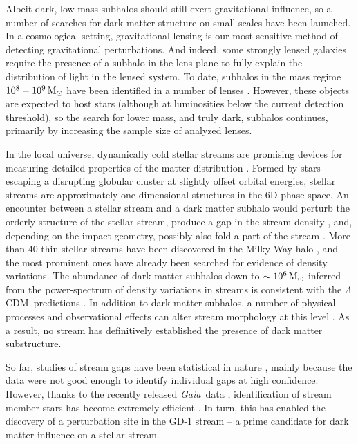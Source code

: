 \documentclass[twocolumn]{aastex62}
\newcommand{\acronym}[1]{{\small{#1}}}
\newcommand{\gaia}{\textsl{Gaia}}
\newcommand{\lcdm}{\acronym{$\Lambda$CDM}}
\begin{document}
Albeit dark, low-mass subhalos should still exert gravitational influence, so a number of searches for dark matter structure on small scales have been launched.
In a cosmological setting, gravitational lensing is our most sensitive method of detecting gravitational perturbations.
And indeed, some strongly lensed galaxies require the presence of a subhalo in the lens plane to fully explain the distribution of light in the lensed system.
To date, subhalos in the mass regime $10^8-10^9\,\rm M_\odot$ have been identified in a number of lenses \citep[e.g.,][]{vegetti2012,hezaveh2016}.
However, these objects are expected to host stars (although at luminosities below the current detection threshold), so the search for lower mass, and truly dark, subhalos continues, primarily by increasing the sample size of analyzed lenses.

In the local universe, dynamically cold stellar streams are promising devices for measuring detailed properties of the matter distribution \citep[e.g.,][]{johnston1999, bh2018}.
Formed by stars escaping a disrupting globular cluster at slightly offset orbital energies, stellar streams are approximately one-dimensional structures in the 6D phase space.
An encounter between a stellar stream and a dark matter subhalo would perturb the orderly structure of the stellar stream, produce a gap in the stream density \citep[e.g.,][]{carlberg2012}, and, depending on the impact geometry, possibly also fold a part of the stream \citep[e.g.,][]{yoon2011}.
More than 40 thin stellar streams have been discovered in the Milky Way halo \citep{gc2016}, and the most prominent ones have already been searched for evidence of density variations.
The abundance of dark matter subhalos down to $\sim10^6\,\rm M_\odot$ inferred from the power-spectrum of density variations in streams is consistent with the \lcdm\ predictions \citep[e.g.,][]{carlberg2012,cg2013}.
In addition to dark matter subhalos, a number of physical processes and observational effects can alter stream morphology at this level \citep[e.g.,][]{kupper2008, amorisco2016, ibata2016}.
As a result, no stream has definitively established the presence of dark matter substructure.

So far, studies of stream gaps have been statistical in nature \citep[e.g.,][]{erkal2017}, mainly because the data were not good enough to identify individual gaps at high confidence.
However, thanks to the recently released \gaia\ data \citep{gdr2}, identification of stream member stars has become extremely efficient \citep[e.g.,][]{malhan2018}.
In turn, this has enabled the discovery of a perturbation site in the GD-1 stream \citep{pwb} -- a prime candidate for dark matter influence on a stellar stream.
\end{document}
